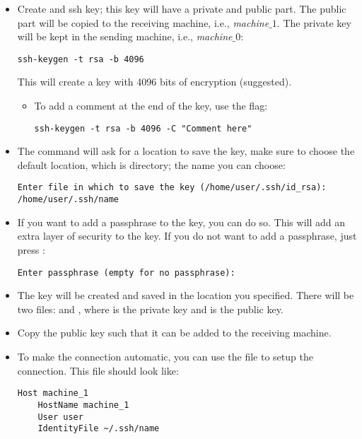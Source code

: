 \begin{itemize}
    \item Create and ssh key; this key will have a private and public part. The public part will be
    copied to the receiving machine, i.e., \textit{machine$\_1$}. The private key will be kept in
    the sending machine, i.e., \textit{machine$\_0$}:
    \begin{verbatim}
ssh-keygen -t rsa -b 4096
    \end{verbatim}
    This will create a key with 4096 bits of encryption (suggested).
    \begin{itemize}
        \item To add a comment at the end of the key, use the  flag:
        \begin{verbatim}
ssh-keygen -t rsa -b 4096 -C "Comment here"
        \end{verbatim}
    \end{itemize}
    \item The command will ask for a location to save the key, make sure to choose the default
    location, which is  directory; the name you can choose:
    \begin{verbatim}
Enter file in which to save the key (/home/user/.ssh/id_rsa): /home/user/.ssh/name
    \end{verbatim}
    \item If you want to add a passphrase to the key, you can do so. This will add an extra layer of
    security to the key. If you do not want to add a passphrase, just press :
    \begin{verbatim}
Enter passphrase (empty for no passphrase):
    \end{verbatim}
    \item The key will be created and saved in the location you specified. There will be two files:
     and , where  is the private key
    and  is the public key.
    \item Copy the public key such that it can be added to the receiving
    machine.
    \item To make the connection automatic, you can use the file  to
    setup the connection. This file should look like:
    \begin{verbatim}
Host machine_1
    HostName machine_1
    User user
    IdentityFile ~/.ssh/name
    \end{verbatim}
\end{itemize}

